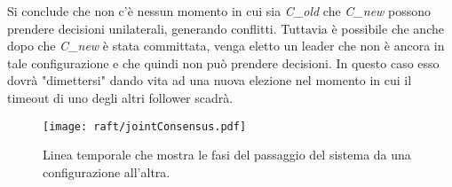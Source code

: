 Si conclude che non c'è nessun momento in cui sia \textit{C\_old} che \textit{C\_new} possono prendere decisioni unilaterali, generando conflitti.
Tuttavia è possibile che anche dopo che \textit{C\_new} è stata committata, venga eletto un leader che non è ancora in tale configurazione e che quindi non può prendere decisioni. In questo caso esso dovrà "dimettersi" dando vita ad una nuova elezione nel momento in cui il timeout di uno degli altri follower scadrà.



  \begin{figure}[H]
    \centering
    \texttt{[image: raft/jointConsensus.pdf]}
    \caption{Linea temporale che mostra le fasi del passaggio del sistema da una configurazione all'altra.}
    \label{fig:figure 9}
  \end{figure}

